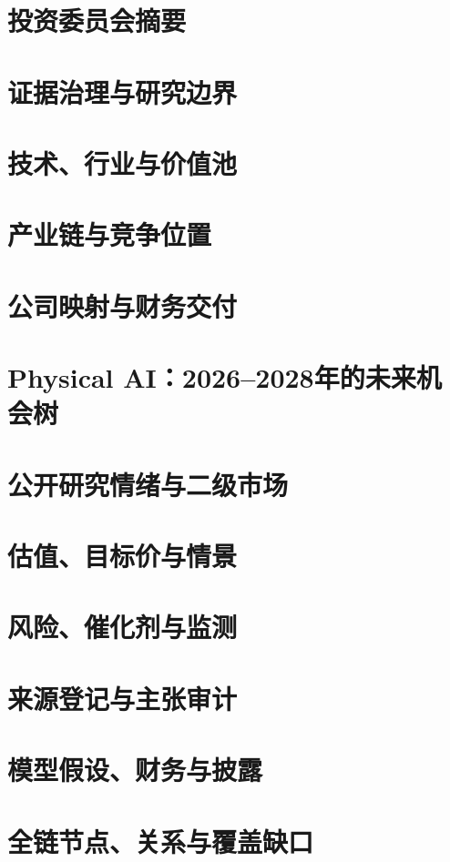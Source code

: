 \documentclass[a4paper,11pt,openany,fontset=none]{ctexrep}
\begin{document}
\astockcover
\tableofcontents
\clearpage

\chapter{投资委员会摘要}

\chapter{证据治理与研究边界}

\chapter{技术、行业与价值池}

\chapter{产业链与竞争位置}

\chapter{公司映射与财务交付}

\chapter{Physical AI：2026--2028年的未来机会树}

\chapter{公开研究情绪与二级市场}

\chapter{估值、目标价与情景}

\chapter{风险、催化剂与监测}


\appendix
\chapter{来源登记与主张审计}

\chapter{模型假设、财务与披露}

\chapter{全链节点、关系与覆盖缺口}

\end{document}
